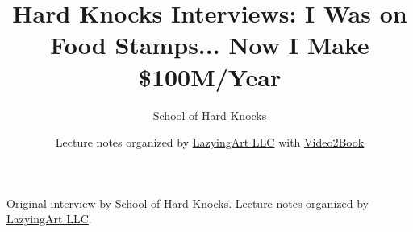 \documentclass[11pt,oneside]{book}
\begin{document}
\frontmatter
\title{Hard Knocks Interviews: I Was on Food Stamps... Now I Make \$100M/Year}
\author{School of Hard Knocks}
\date{Lecture notes organized by \href{https://lazying.art}{LazyingArt LLC} with \href{https://github.com/lachlanchen/Video2Book}{Video2Book}}
\maketitle
\begin{center}
\small Original interview by School of Hard Knocks. Lecture notes organized by \href{https://lazying.art}{LazyingArt LLC}.
\end{center}
\clearpage
\mainmatter

\end{document}

